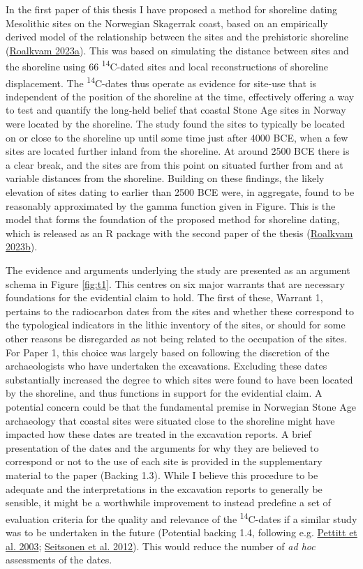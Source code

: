 \documentclass[
  12pt,
  a4paper,
  oneside]{book}
\begin{document}
In the first paper of this thesis I have proposed a method for shoreline dating Mesolithic sites on the Norwegian Skagerrak coast, based on an empirically derived model of the relationship between the sites and the prehistoric shoreline (\protect\hyperlink{ref-roalkvam2023}{Roalkvam 2023a}). This was based on simulating the distance between sites and the shoreline using 66 \textsuperscript{14}C-dated sites and local reconstructions of shoreline displacement. The \textsuperscript{14}C-dates thus operate as evidence for site-use that is independent of the position of the shoreline at the time, effectively offering a way to test and quantify the long-held belief that coastal Stone Age sites in Norway were located by the shoreline. The study found the sites to typically be located on or close to the shoreline up until some time just after 4000 BCE, when a few sites are located further inland from the shoreline. At around 2500 BCE there is a clear break, and the sites are from this point on situated further from and at variable distances from the shoreline. Building on these findings, the likely elevation of sites dating to earlier than 2500 BCE were, in aggregate, found to be reasonably approximated by the gamma function given in Figure. This is the model that forms the foundation of the proposed method for shoreline dating, which is released as an R package with the second paper of the thesis (\protect\hyperlink{ref-roalkvam2023b}{Roalkvam 2023b}).

The evidence and arguments underlying the study are presented as an argument schema in Figure \ref{fig:t1}. This centres on six major warrants that are necessary foundations for the evidential claim to hold. The first of these, Warrant 1, pertains to the radiocarbon dates from the sites and whether these correspond to the typological indicators in the lithic inventory of the sites, or should for some other reasons be disregarded as not being related to the occupation of the sites. For Paper 1, this choice was largely based on following the discretion of the archaeologists who have undertaken the excavations. Excluding these dates substantially increased the degree to which sites were found to have been located by the shoreline, and thus functions in support for the evidential claim. A potential concern could be that the fundamental premise in Norwegian Stone Age archaeology that coastal sites were situated close to the shoreline might have impacted how these dates are treated in the excavation reports. A brief presentation of the dates and the arguments for why they are believed to correspond or not to the use of each site is provided in the supplementary material to the paper (Backing 1.3). While I believe this procedure to be adequate and the interpretations in the excavation reports to generally be sensible, it might be a worthwhile improvement to instead predefine a set of evaluation criteria for the quality and relevance of the \textsuperscript{14}C-dates if a similar study was to be undertaken in the future (Potential backing 1.4, following e.g. \protect\hyperlink{ref-pettitt2003}{Pettitt et al. 2003}; \protect\hyperlink{ref-seitsonen2012}{Seitsonen et al. 2012}). This would reduce the number of \emph{ad hoc} assessments of the dates.
\end{document}

